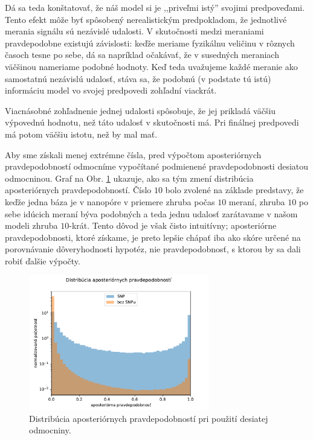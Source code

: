 Dá sa teda konštatovať, že náš model si je ,,priveľmi istý'' svojimi predpoveďami. Tento efekt môže
byť spôsobený nerealistickým predpokladom, že jednotlivé merania 
signálu sú nezávislé udalosti. V skutočnosti medzi meraniami pravdepodobne existujú závislosti: keďže
meriame fyzikálnu veličinu v rôznych časoch tesne po sebe, dá sa napríklad očakávať, že v susedných
meraniach väčšinou nameriame podobné hodnoty. Keď teda uvažujeme každé meranie ako samostatnú nezávislú 
udalosť, stáva sa, že podobnú (v podstate tú istú) informáciu model vo svojej predpovedi zohľadní
viackrát.

Viacnásobné zohľadnenie jednej udalosti spôsobuje, že jej prikladá väčšiu výpovednú hodnotu, než táto
udalosť v skutočnosti má. Pri finálnej predpovedi má potom väčšiu istotu, než by mal mať.

Aby sme získali menej extrémne čísla, pred výpočtom aposteriórnych pravdepodobností odmocníme vypočítané 
podmienené pravdepodobnosti desiatou odmocninou. Graf na Obr. \ref{fig:aposteriori_root} ukazuje, ako sa tým
zmení distribúcia aposteriórnych pravdepodobností. Číslo $10$ bolo zvolené na základe predstavy, že
keďže jedna báza je v nanopóre v priemere zhruba počas $10$ meraní, zhruba $10$ po sebe idúcich meraní 
býva podobných a teda jednu udalosť zarátavame v našom modeli zhruba $10$-krát. Tento dôvod je však
čisto intuitívny; aposteriórne pravdepodobnosti, ktoré získame, je preto lepšie chápať iba ako skóre 
určené na porovnávanie dôveryhodnosti hypotéz, nie pravdepodobnosť, s ktorou by sa dali robiť ďalšie 
výpočty. 

\begin{figure}[t]
\centerline{\includegraphics[width=0.7\textwidth]{plots/0_root_eqbins}}
\caption[Aposteriórne pravdepodobnosti pri použití desiatej odmocniny]{Distribúcia aposteriórnych pravdepodobností pri použití desiatej odmocniny.}
\label{fig:aposteriori_root}
\end{figure}

